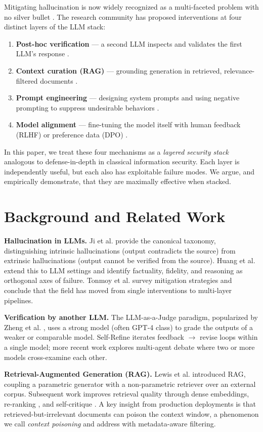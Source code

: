\documentclass[11pt,a4paper]{article}
\begin{document}
Mitigating hallucination is now widely recognized as a multi-faceted problem with no silver bullet \cite{4}. The research community has proposed interventions at four distinct layers of the LLM stack:
\begin{enumerate}
    \item \textbf{Post-hoc verification} --- a second LLM inspects and validates the first LLM's response \cite{8,9}.
    \item \textbf{Context curation (RAG)} --- grounding generation in retrieved, relevance-filtered documents \cite{5,6,7}.
    \item \textbf{Prompt engineering} --- designing system prompts and using negative prompting to suppress undesirable behaviors \cite{12,13}.
    \item \textbf{Model alignment} --- fine-tuning the model itself with human feedback (RLHF) or preference data (DPO) \cite{1,15,17}.
\end{enumerate}

In this paper, we treat these four mechanisms as a \textit{layered security stack} analogous to defense-in-depth in classical information security. Each layer is independently useful, but each also has exploitable failure modes. We argue, and empirically demonstrate, that they are maximally effective when stacked.

\section{Background and Related Work}
\textbf{Hallucination in LLMs.} Ji et al. \cite{2} provide the canonical taxonomy, distinguishing intrinsic hallucinations (output contradicts the source) from extrinsic hallucinations (output cannot be verified from the source). Huang et al. \cite{3} extend this to LLM settings and identify factuality, fidelity, and reasoning as orthogonal axes of failure. Tonmoy et al. \cite{4} survey mitigation strategies and conclude that the field has moved from single interventions to multi-layer pipelines.

\textbf{Verification by another LLM.} The LLM-as-a-Judge paradigm, popularized by Zheng et al. \cite{8}, uses a strong model (often GPT-4 class) to grade the outputs of a weaker or comparable model. Self-Refine \cite{9} iterates feedback $\rightarrow$ revise loops within a single model; more recent work explores multi-agent debate \cite{10} where two or more models cross-examine each other.

\textbf{Retrieval-Augmented Generation (RAG).} Lewis et al. \cite{5} introduced RAG, coupling a parametric generator with a non-parametric retriever over an external corpus. Subsequent work improves retrieval quality through dense embeddings, re-ranking \cite{6}, and self-critique \cite{7}. A key insight from production deployments is that retrieved-but-irrelevant documents can poison the context window, a phenomenon we call \textit{context poisoning} and address with metadata-aware filtering.
\end{document}
